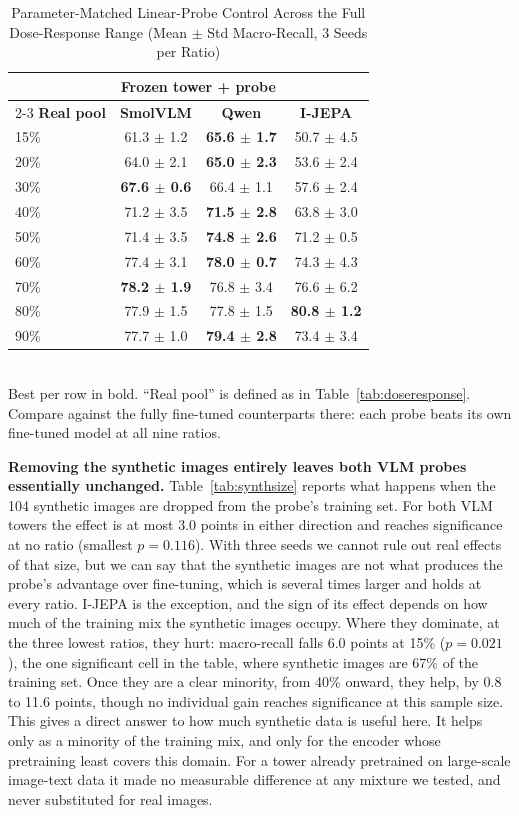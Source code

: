 \documentclass[conference]{IEEEtran}
\begin{document}
\begin{table}[t]
\caption{Parameter-Matched Linear-Probe Control Across the Full Dose-Response Range (Mean $\pm$ Std Macro-Recall, 3 Seeds per Ratio)}
\label{tab:linearprobe}
\centering
\begin{tabular}{lccc}
\toprule
 & \multicolumn{2}{c}{\textbf{Frozen tower + probe}} & \\
\cmidrule(lr){2-3}
\textbf{Real pool} & \textbf{SmolVLM} & \textbf{Qwen} & \textbf{I-JEPA} \\
\midrule
15\% & 61.3 $\pm$ 1.2 & \textbf{65.6 $\pm$ 1.7} & 50.7 $\pm$ 4.5 \\
20\% & 64.0 $\pm$ 2.1 & \textbf{65.0 $\pm$ 2.3} & 53.6 $\pm$ 2.4 \\
30\% & \textbf{67.6 $\pm$ 0.6} & 66.4 $\pm$ 1.1 & 57.6 $\pm$ 2.4 \\
40\% & 71.2 $\pm$ 3.5 & \textbf{71.5 $\pm$ 2.8} & 63.8 $\pm$ 3.0 \\
50\% & 71.4 $\pm$ 3.5 & \textbf{74.8 $\pm$ 2.6} & 71.2 $\pm$ 0.5 \\
60\% & 77.4 $\pm$ 3.1 & \textbf{78.0 $\pm$ 0.7} & 74.3 $\pm$ 4.3 \\
70\% & \textbf{78.2 $\pm$ 1.9} & 76.8 $\pm$ 3.4 & 76.6 $\pm$ 6.2 \\
80\% & 77.9 $\pm$ 1.5 & 77.8 $\pm$ 1.5 & \textbf{80.8 $\pm$ 1.2} \\
90\% & 77.7 $\pm$ 1.0 & \textbf{79.4 $\pm$ 2.8} & 73.4 $\pm$ 3.4 \\
\bottomrule
\end{tabular}
\\[2pt]
{\footnotesize Best per row in bold. ``Real pool'' is defined as in Table~\ref{tab:doseresponse}. Compare against the fully fine-tuned counterparts there: each probe beats its own fine-tuned model at all nine ratios.}
\end{table}

\textbf{Removing the synthetic images entirely leaves both VLM probes essentially unchanged.} Table~\ref{tab:synthsize} reports what happens when the 104 synthetic images are dropped from the probe's training set. For both VLM towers the effect is at most 3.0 points in either direction and reaches significance at no ratio (smallest $p=0.116$). With three seeds we cannot rule out real effects of that size, but we can say that the synthetic images are not what produces the probe's advantage over fine-tuning, which is several times larger and holds at every ratio. I-JEPA is the exception, and the sign of its effect depends on how much of the training mix the synthetic images occupy. Where they dominate, at the three lowest ratios, they hurt: macro-recall falls 6.0 points at 15\% ($p=0.021$), the one significant cell in the table, where synthetic images are 67\% of the training set. Once they are a clear minority, from 40\% onward, they help, by 0.8 to 11.6 points, though no individual gain reaches significance at this sample size. This gives a direct answer to how much synthetic data is useful here. It helps only as a minority of the training mix, and only for the encoder whose pretraining least covers this domain. For a tower already pretrained on large-scale image-text data it made no measurable difference at any mixture we tested, and never substituted for real images.
\end{document}
